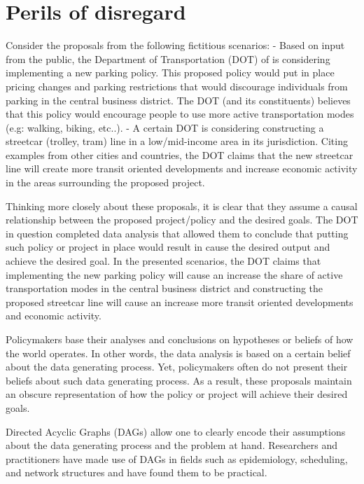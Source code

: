 \section{Perils of disregard}
\label{sec:graph-importance}

Consider the proposals from the following fictitious scenarios: 
- Based on input from the public, the Department of Transportation (DOT) of  is considering implementing a new parking policy. 
This proposed policy would put in place pricing changes and parking restrictions that would discourage individuals from parking in the central business district. 
The DOT (and its constituents) believes that this policy would encourage people to use more active transportation modes (e.g: walking, biking, etc..).
- A certain DOT is considering constructing a streetcar (trolley, tram) line in a low/mid-income area in its jurisdiction.
Citing examples from other cities and countries, the DOT claims that the new streetcar line will create more transit oriented
developments and increase economic activity in the areas surrounding the proposed project. 


Thinking more closely about these proposals, it is clear that they assume a causal relationship between the proposed project/policy and the desired goals. 
The DOT in question completed data analysis that allowed them to conclude that putting such policy or project in place would result in cause the desired output and achieve the desired goal.
In the presented scenarios, the DOT claims that implementing the new parking policy will cause an increase the share of 
active transportation modes in the central business district and constructing the proposed streetcar line will 
cause an increase more transit oriented developments and economic activity.

Policymakers base their analyses and conclusions on hypotheses or beliefs of how the world operates.
In other words, the data analysis is based on a certain belief about the data generating process.
Yet, policymakers often do not present their beliefs about such data generating process.
As a result, these proposals maintain an obscure representation of how the policy or project will achieve their desired goals. 

Directed Acyclic Graphs (DAGs) allow one to clearly encode their assumptions about the data generating process and the problem at hand.
Researchers and practitioners have made use of DAGs in fields such as epidemiology, scheduling, and network structures and have found them to be practical.


